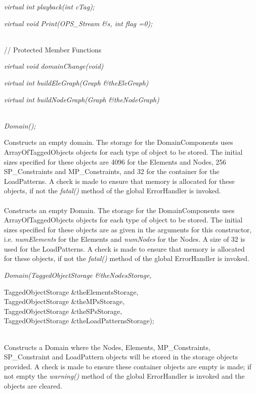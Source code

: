 {\em virtual  int  playback(int cTag);}

{\em virtual  void Print(OPS_Stream \&s, int flag =0);}

\\  
// Protected Member Functions  

{\em virtual void domainChange(void) }

{\em virtual int buildEleGraph(Graph \&theEleGraph)} 

{\em virtual int buildNodeGraph(Graph \&theNodeGraph)} 


  \\
{\em Domain();}  

Constructs an empty domain. The storage for the DomainComponents uses
ArrayOfTaggedObjects objects for each type of object to be stored. The
initial sizes specified for these objects are 4096 for the Elements
and Nodes, 256 SP\_Constraints and MP\_Constraints, and 32 for the
container for the LoadPatterns. A check is made to ensure that memory
is allocated for these objects, if not the {\em fatal()} method of the
global ErrorHandler is invoked.\\   

  \\ 
Constructs an empty Domain. The storage for the DomainComponents uses
ArrayOfTaggedObjects objects for each type of object to be stored. The
initial sizes specified for these objects are as given in the
arguments for this constructor, i.e. {\em numElements} for the
Elements and {\em numNodes} for the Nodes. A size of 32 is used for
the LoadPatterns. A check is made to ensure that memory
is allocated for these objects, if not the {\em fatal()} method of the
global ErrorHandler is invoked.\\   


{\em Domain(TaggedObjectStorage \&theNodesStorage, 

\indent\indent\indent           TaggedObjectStorage \&theElementsStorage, \\
\indent\indent\indent           TaggedObjectStorage \&theMPsStorage, \\
\indent\indent\indent           TaggedObjectStorage \&theSPsStorage, \\
\indent\indent\indent           TaggedObjectStorage \&theLoadPatternsStorage); } \\
Constructs a Domain where the Nodes, Elements, MP\_Constraints,
SP\_Constraint and LoadPattern objects will be
stored in the storage objects provided. A check is made to ensure
these container objects are empty is made; if not empty the {\em warning()}
method of the global ErrorHandler is invoked and the objects are
cleared. \\

